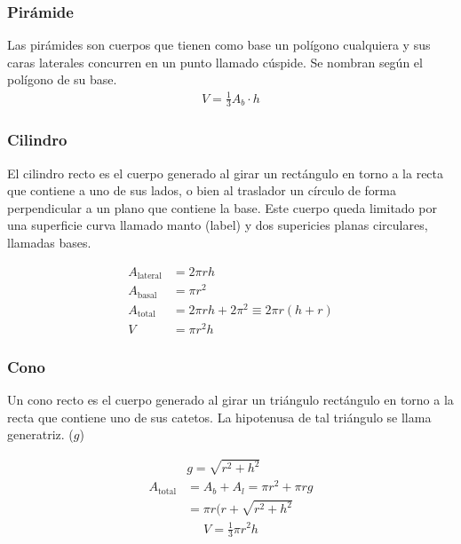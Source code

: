 \subsubsection{Pirámide}
Las pirámides son cuerpos que tienen como base un polígono cualquiera y sus caras laterales concurren en un punto llamado cúspide. Se nombran según el polígono de su base.\\
\begin{equation*}
    \begin{aligned} 
    V = \frac{1}{3}A_b\cdot h
    \end{aligned}
\end{equation*}
\subsubsection{Cilindro}
El cilindro recto es el cuerpo generado al girar un rectángulo en torno a la recta que contiene a uno de sus lados, o bien al traslador un círculo de forma perpendicular a un plano que contiene la base. Este cuerpo queda limitado por una superficie curva llamado manto (label) y dos supericies planas circulares, llamadas bases.

\begin{equation*}
    \begin{split} 
    A_{\text{lateral}} &= 2\pi rh\\
    A_{\text{basal}} &= \pi r^2\\
    A_{\text{total}} &= 2\pi rh + 2\pi ^2 \equiv 2\pi r(h+r)\\
    V &= \pi r^2h
    \end{split}
\end{equation*}

\subsubsection{Cono}
Un cono recto es el cuerpo generado al girar un triángulo rectángulo en torno a la recta que contiene uno de sus catetos. La hipotenusa de tal triángulo se llama generatriz. ($g$)

\begin{equation*}
    \begin{split} 
        &g = \sqrt{r^2 + h^2}\\
        A_{\text{total}} &= A_b + A_l = \pi r^2 + \pi rg \\
        &= \pi r(r + \sqrt{r^2 + h^2}
    \end{split}
\end{equation*}
\begin{equation*}
    \begin{aligned} 
        V = \frac{1}{3}\pi r^2h
    \end{aligned}
\end{equation*}

